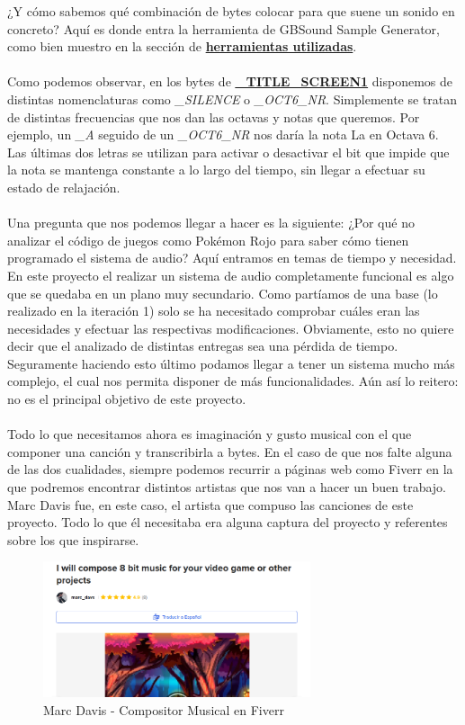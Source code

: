¿Y cómo sabemos qué combinación de bytes colocar para que suene un sonido en concreto? Aquí es donde entra la herramienta de GBSound Sample Generator, como bien muestro en la sección de \hyperref[GBSound]{\textbf{herramientas utilizadas}}.
\\ \\
Como podemos observar, en los bytes de \hyperref[code:musicromx]{\textbf{\_TITLE\_SCREEN1}} disponemos de distintas nomenclaturas como \textit{\_SILENCE} o  \textit{\_OCT6\_NR}. Simplemente se tratan de distintas frecuencias que nos dan las octavas y notas que queremos. Por ejemplo, un \textit{\_A} seguido de un \textit{\_OCT6\_NR} nos daría la nota La en Octava 6. Las últimas dos letras se utilizan para activar o desactivar el bit que impide que la nota se mantenga constante a lo largo del tiempo, sin llegar a efectuar su estado de relajación.
\\ \\
Una pregunta que nos podemos llegar a hacer es la siguiente: ¿Por qué no analizar el código de juegos como Pokémon Rojo para saber cómo tienen programado el sistema de audio? Aquí entramos en temas de tiempo y necesidad. En este proyecto el realizar un sistema de audio completamente funcional es algo que se quedaba en un plano muy secundario. Como partíamos de una base (lo realizado en la iteración 1) solo se ha necesitado comprobar cuáles eran las necesidades y efectuar las respectivas modificaciones. Obviamente, esto no quiere decir que el analizado de distintas entregas sea una pérdida de tiempo. Seguramente haciendo esto último podamos llegar a tener un sistema mucho más complejo, el cual nos permita disponer de más funcionalidades. Aún así lo reitero: no es el principal objetivo de este proyecto.
\\ \\
Todo lo que necesitamos ahora es imaginación y gusto musical con el que componer una canción y transcribirla a bytes. En el caso de que nos falte alguna de las dos cualidades, siempre podemos recurrir a páginas web como Fiverr en la que podremos encontrar distintos artistas que nos van a hacer un buen trabajo. Marc Davis fue, en este caso, el artista que compuso las canciones de este proyecto. Todo lo que él necesitaba era alguna captura del proyecto y referentes sobre los que inspirarse.

\begin{figure}[h]
\centering
\includegraphics[width=0.7\textwidth]{include/images/desarrollo/marcdavs.png}
\caption{Marc Davis - Compositor Musical en Fiverr}
\label{figure:marcdavs}
\end{figure}

